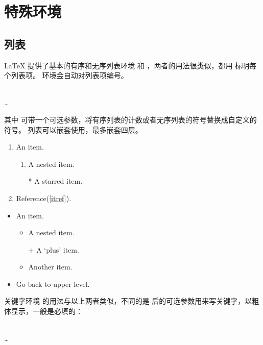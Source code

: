 \section{特殊环境}\label{sec:envs}

\subsection{列表}\label{subsec:lists}

\LaTeX{} 提供了基本的有序和无序列表环境  和 ，两者的用法很类似，都用  标明每个列表项。
 环境会自动对列表项编号。
\begin{command}
 \\
 \ldots \\
\end{command}

其中  可带一个可选参数，将有序列表的计数或者无序列表的符号替换成自定义的符号。
列表可以嵌套使用，最多嵌套四层。
\begin{example}
\begin{enumerate}
  \item An item.
  \begin{enumerate}
    \item A nested item.\label{itref}
    \item[*] A starred item.
  \end{enumerate}
  \item Reference(\ref{itref}).
\end{enumerate}
\end{example}

\begin{example}
\begin{itemize}
  \item An item.
  \begin{itemize}
    \item A nested item.
    \item[+] A `plus' item.
    \item Another item.
  \end{itemize}
  \item Go back to upper level.
\end{itemize}
\end{example}

关键字环境  的用法与以上两者类似，不同的是  后的可选参数用来写关键字，以粗体显示，一般是必填的：
\begin{command}
 \\
   \ldots \\
\end{command}

